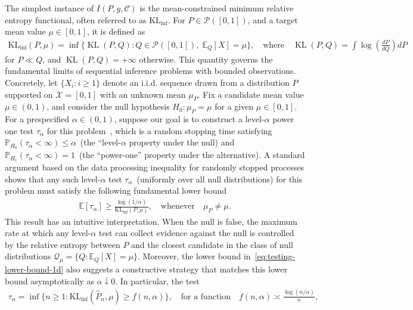 \documentclass{article}
\theoremstyle{plain}
\theoremstyle{definition}
\newcommand{\lrp}[1]{\left( #1 \right)}
\newcommand{\KLinf}{\operatorname{KL_{inf}}}
\newcommand{\KL}{\operatorname{KL}}
\newcommand{\calP}{\mathcal P}
\newcommand{\calC}{\mathcal C}
\newcommand{\calQ}{\mathcal Q}
\newcommand{\calX}{\mathcal X}
\newcommand{\qtext}[1]{\quad \text{#1} \quad}
\newcommand{\iid}{i.i.d.\xspace}
\begin{document}
The simplest instance of $I(P, g, \calC)$ is the mean-constrained minimum relative entropy functional, often referred to as $\KLinf$. For $P \in \calP([0,1])$, and a target mean value $\mu \in [0,1]$, it is defined as 
\begin{align}
    \KLinf(P, \mu) = \inf \{\KL(P, Q): Q \in \calP([0,1]), \; \mathbb{E}_{Q}[X] = \mu \}, \qtext{where} \KL(P, Q) = \int \log \lrp{\frac{dP}{dQ}} dP  
\end{align}
for $P \ll Q$, and $\KL(P, Q) = + \infty$ otherwise. 
This quantity governs the fundamental limits of sequential inference problems with bounded observations. 
Concretely, let $\{X_i: i \geq 1\}$ denote an \iid sequence drawn from a distribution $P$ supported on $\calX = [0,1]$ with an unknown mean $\mu_P$. Fix a candidate mean value $\mu \in (0,1)$, and consider the null hypothesis $H_0: \mu_P=\mu$ for a given $\mu \in [0,1]$. For a prespecified $\alpha \in (0, 1)$, suppose our goal is to construct a level-$\alpha$ power one test $\tau_\alpha$ for this problem~\citep{darling1968some},  which is a random stopping time satisfying $\mathbb{P}_{H_0}(\tau_\alpha < \infty) \leq \alpha$~(the ``level-$\alpha$ property under the null) and $\mathbb{P}_{H_1}(\tau_\alpha < \infty) = 1$~(the ``power-one'' property under the alternative). 
 A standard argument based on the data processing inequality for randomly stopped processes shows that any such level-$\alpha$ test $\tau_\alpha$~(uniformly over all null distributions) for this problem must satisfy the following fundamental lower bound \citep{garivier2019explore}
\begin{align}
    \mathbb{E}[\tau_\alpha] \geq \frac{\log(1/\alpha)}{\KLinf(P, \mu)}, \qtext{whenever} \mu_P \neq \mu. \label{eq:testing-lower-bound-1d}
\end{align}
This result has an intuitive interpretation. When the null is false, the maximum rate at which any level-$\alpha$ test can collect evidence against the null is controlled by the relative entropy between $P$ and the closest candidate in the class of null distributions $\calQ_{\mu} = \{Q: \mathbb{E}_Q[X] = \mu\}$. 
Moreover, the lower bound in~\eqref{eq:testing-lower-bound-1d} also suggests a constructive strategy that matches this lower bound asymptotically as $\alpha\downarrow 0$. In particular, the test 
\begin{align}
    \tau_\alpha = \inf \{n \geq 1: \KLinf(\widehat{P}_n, \mu) \geq f(n, \alpha) \},  \qtext{for a function} f(n, \alpha) \asymp \frac{\log(n/\alpha)}{n},
\end{align}
\end{document}
